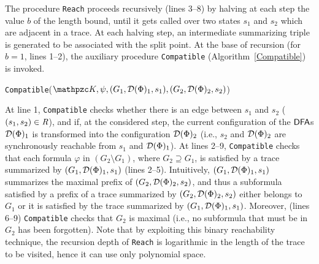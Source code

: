 The procedure \texttt{Reach} proceeds recursively (lines 3--8) by halving at each step the value $b$ of the length bound, until it gets called over two states $s_1$ and $s_2$ which are
adjacent in a trace. At each halving step, an intermediate summarizing triple is generated to be associated with the split point.
%
At the base of recursion (for $b=1$, lines 1--2), the auxiliary procedure \texttt{Compatible} (Algorithm~\ref{Compatible}) is invoked. 

\begin{algorithm}[tp]
    \caption{\texttt{Compatible}($\Ku,\psi,(G_1,\Du(\Phi)_1,s_1), (G_2,\Du(\Phi)_2, s_2)$)}\label{Compatible}
    \begin{algorithmic}[1]        
                    \Return{$\bot$}
                \EndIf
            \EndFor
                    \Return{$\bot$}
                \EndIf
            \EndFor
            \Return{$\top$}
        \Else
            \Return{$\bot$}
        \EndIf
    \end{algorithmic}
\end{algorithm}

At line 1, \texttt{Compatible} checks whether there is an edge between  $s_1$ and $s_2$ ($(s_1,s_2)\in \textit{R}$), and if, at the considered step,
the current configuration of the $\text{\sffamily DFA}$s $\mathcal{D}(\Phi)_1$ is transformed into the configuration $\mathcal{D}(\Phi)_2$   (i.e., $s_2$ and  $\mathcal{D}(\Phi)_2$ are synchronously reachable from $s_1$ and  $\mathcal{D}(\Phi)_1$). 
%
At lines 2--9, \texttt{Compatible} checks that each formula $\varphi$ in $(G_2\setminus G_1)$, where $G_2\supseteq G_1$, is satisfied by 
a trace summarized by $(G_1,\mathcal{D}(\Phi)_1,s_1)$ (lines 2--5). Intuitively, $(G_1,\mathcal{D}(\Phi)_1,s_1)$ summarizes the maximal prefix of 
$(G_2,\mathcal{D}(\Phi)_2,s_2)$, and thus a subformula satisfied by a 
prefix of a trace summarized by $(G_2,\mathcal{D}(\Phi)_2,s_2)$ either belongs to $G_1$ or it is satisfied by the trace summarized by $(G_1,\mathcal{D}(\Phi)_1,s_1)$.
Moreover, (lines 6--9) \texttt{Compatible} checks that $G_2$ is maximal (i.e., no subformula that must be in $G_2$ has been forgotten).
%
Note that by exploiting this binary reachability technique,
the recursion depth of \texttt{Reach} is logarithmic in the length of the trace to be visited, hence it can use only polynomial space.

